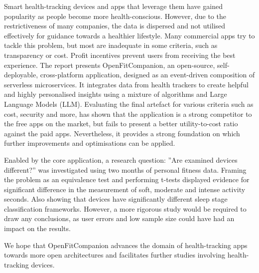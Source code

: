 %
{\singlespacing
Smart health-tracking devices and apps that leverage them have gained popularity as people become more health-conscious. However, due to the restrictiveness of many companies, the data is dispersed and not utilised effectively for guidance towards a healthier lifestyle. Many commercial apps try to tackle this problem, but most are inadequate in some criteria, such as transparency or cost. Profit incentives prevent users from receiving the best experience. The report presents OpenFitCompanion, an open-source, self-deployable, cross-platform application, designed as an event-driven composition of serverless microservices. It integrates data from health trackers to create helpful and highly personalised insights using a mixture of algorithms and Large Language Models (LLM). Evaluating the final artefact for various criteria such as cost, security and more, has shown that the application is a strong competitor to the free apps on the market, but fails to present a better utility-to-cost ratio against the paid apps. Nevertheless, it provides a strong foundation on which further improvements and optimisations can be applied. 

Enabled by the core application, a research question: ”Are examined devices different?” was investigated using two months of personal fitness data. Framing the problem as an equivalence test and performing t-tests displayed evidence for significant difference in the measurement of soft, moderate and intense activity seconds. Also showing that devices have significantly different sleep stage classification frameworks. However, a more rigorous study would be required to draw any conclusions, as user errors and low sample size could have had an impact on the results. 

We hope that OpenFitCompanion advances the domain of health-tracking apps towards more open architectures and facilitates further studies involving health-tracking devices. 
}

